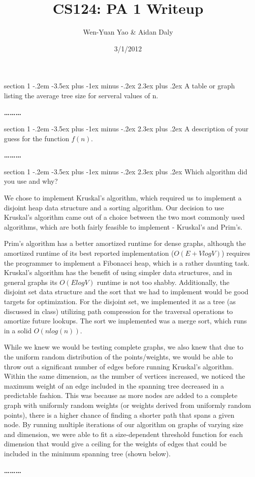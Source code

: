 \documentclass[12pt]{article}
\makeatletter
\newenvironment{problem}{\@startsection
       {section}
       {1}
       {-.2em}
       {-3.5ex plus -1ex minus -.2ex}
       {2.3ex plus .2ex}
       {\pagebreak[3]%
       \large\bf\noindent{Problem }
       }
       }
       {%
       \begin{center}\large\bf \ldots\ldots\ldots\end{center}}
\makeatother
\begin{document}
\title{CS124: PA 1 Writeup}
\author{Wen-Yuan Yao & Aidan Daly}
\date{3/1/2012}
\maketitle
\thispagestyle{empty}

\begin{problem}{}
A table or graph listing the average tree size for serveral values of n.

\end{problem}

\begin{problem}{}
A description of your guess for the function $f(n)$.

\end{problem}

\begin{problem}{}
Which algorithm did you use and why?

We chose to implement Kruskal's algorithm, which required us to implement a disjoint heap data structure and a sorting algorithm.  Our decision to use Kruskal's algorithm came out of a choice between the two most commonly used algorithms, which are both fairly feasible to implement - Kruskal's and Prim's.

Prim's algorithm has a better amortized runtime for dense graphs, although the amortized runtime of its best reported implementation ($O(E + VlogV)$) requires the programmer to implement a Fibonacci heap, which is a rather daunting task.  Kruskal's algorithm has the benefit of using simpler data structures, and in general graphs its $O(ElogV)$ runtime is not too shabby.  Additionally, the disjoint set data structure and the sort that we had to implement would be good targets for optimization.  For the disjoint set, we implemented it as a tree (as discussed in class) utilizing path compression for the traversal operations to amortize future lookups.  The sort we implemented was a merge sort, which runs in a solid $O(nlog(n))$.

While we knew we would be testing complete graphs, we also knew that due to the uniform random distribution of the points/weights, we would be able to throw out a significant number of edges before running Kruskal's algorithm.  Within the same dimension, as the number of vertices increased, we noticed the maximum weight of an edge included in the spanning tree decreased in a predictable fashion.  This was because as more nodes are added to a complete graph with uniformly random weights (or weights derived from uniformly random points), there is a higher chance of finding a shorter path that spans a given node.  By running multiple iterations of our algorithm on graphs of varying size and dimension, we were able to fit a size-dependent threshold function for each dimension that would give a ceiling for the weights of edges that could be included in the minimum spanning tree (shown below).


\end{problem}
\end{document}
